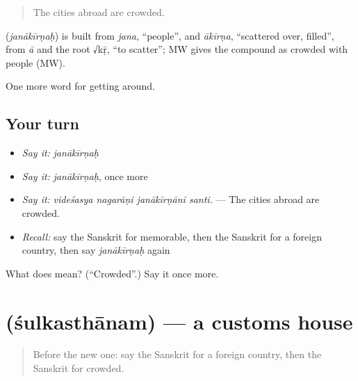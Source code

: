 \begin{quote}
The cities abroad are crowded.
\end{quote}

\begin{cousinweb}
\textbf{} (\emph{janākīrṇaḥ}) is built from \emph{jana}, \textquotedblleft{}people\textquotedblright{}, and \emph{ākīrṇa}, \textquotedblleft{}scattered over, filled\textquotedblright{}, from \emph{ā} and the root √kṝ, \textquotedblleft{}to scatter\textquotedblright{}; MW gives the compound as crowded with people (MW).
\end{cousinweb}

\begin{grammarlens}[title={What you've built}]
One more word for getting around.
\end{grammarlens}

\subsection*{Your turn}
\begin{itemize}
\raggedright
  \item \emph{Say it:} \emph{janākīrṇaḥ}
  \item \emph{Say it:} \emph{janākīrṇaḥ}, once more
  \item \emph{Say it:} \emph{videśasya nagarāṇi janākīrṇāni santi.} — The cities abroad are crowded.
  \item \emph{Recall:} say the Sanskrit for memorable, then the Sanskrit for a foreign country, then say \emph{janākīrṇaḥ} again
\end{itemize}

\begin{tcolorbox}[breakable,colback=teal!4,colframe=teal!35!black,title={Before you move on}]
What does  mean? (\textquotedblleft{}Crowded\textquotedblright{}.) Say it once more.
\end{tcolorbox}
\section[\texorpdfstring{\sk{शुल्कस्थानम्} (śulkasthānam)}{शुल्कस्थानम् (śulkasthānam)}]{ (śulkasthānam) — a customs house}

\label{lesson:SA-C426-sulkasthanam}



\begin{quote}
Before the new one: say the Sanskrit for a foreign country, then the Sanskrit for crowded.
\end{quote}

